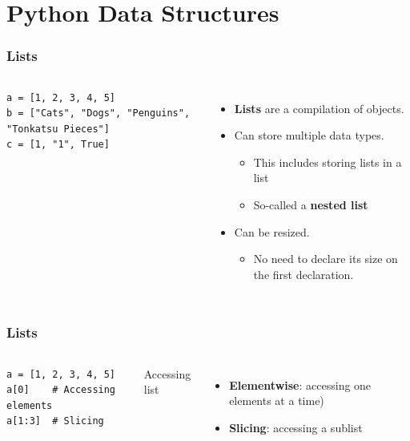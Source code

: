 \documentclass[aspectratio=169]{beamer}
\begin{document}
\section{Python Data Structures}

\begin{frame}[fragile]
    \frametitle{Lists}
    \begin{columns}
            \begin{lstlisting}[style=defaultstyle]
a = [1, 2, 3, 4, 5]
b = ["Cats", "Dogs", "Penguins", "Tonkatsu Pieces"]
c = [1, "1", True]\end{lstlisting}
            \begin{itemize}[<+(1)->]
                \item \textbf{Lists} are a compilation of objects.
                \item Can store multiple data types.
                \begin{itemize}
                    \item This includes storing lists in a list
                    \item So-called a \textbf{nested list}
                \end{itemize}
                \item Can be resized.
                \begin{itemize}
                    \item No need to declare its size on the first declaration.
                \end{itemize}
            \end{itemize}
    \end{columns}
\end{frame}

\begin{frame}[fragile]
    \frametitle{Lists}
    \begin{columns}
            \begin{lstlisting}[style=defaultstyle]
a = [1, 2, 3, 4, 5]
a[0]    # Accessing elements
a[1:3]  # Slicing
\end{lstlisting}
         Accessing list
            \begin{itemize}[<+(2)->]
                \item \textbf{Elementwise}: accessing one elements at a time)
                \item \textbf{Slicing}: accessing a sublist
            \end{itemize}
    \end{columns}
\end{frame}
\end{document}

